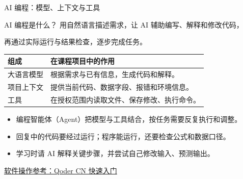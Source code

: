 \documentclass[9pt]{ctexbeamer}
\begin{document}
\begin{frame}{AI 编程：模型、上下文与工具}
  \begin{block}{AI 编程是什么？}
    用自然语言描述需求，让 AI 辅助编写、解释和修改代码，\par
    再通过实际运行与结果检查，逐步完成任务。
  \end{block}
  \begin{tabular}{p{}p{}}
    \toprule
    组成 & 在课程项目中的作用 \\
    \midrule
    大语言模型 & 根据需求与已有信息，生成代码和解释。\\[7pt]
    项目上下文 & 提供当前代码、数据字段、报错和环境信息。\\[7pt]
    工具 & 在授权范围内读取文件、保存修改、执行命令。\\
    \bottomrule
  \end{tabular}
  \vspace{0.2cm}
  \begin{itemize}
    \item 编程智能体（Agent）把模型与工具结合，按任务需要反复执行和调整。
    \item 回复中的代码要经过运行；程序能运行，还要检查公式和数据口径。
    \item 学习时请 AI 解释关键步骤，并尝试自己修改输入、预测输出。
  \end{itemize}
  {\tiny\href{https://docs.qoder.cn/qoder/quickstart}{软件操作参考：Qoder CN 快速入门}}
\end{frame}
\end{document}
